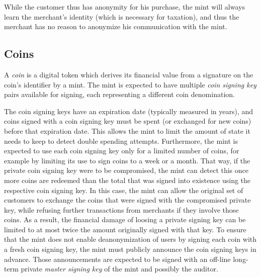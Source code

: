 \documentclass{llncs}
\begin{document}
While the customer thus has anonymity for his purchase, the mint will
always learn the merchant's identity (which is necessary for
taxation), and thus the merchant has no reason to anonymize his
communication with the mint.



\subsection{Coins}

A \emph{coin} is a digital token which derives its financial value
from a signature on the coin's identifier by a mint.  The mint is
expected to have multiple {\em coin signing key} pairs available for
signing, each representing a different coin denomination.

The coin signing keys have an expiration date (typically measured in
years), and coins signed with a coin signing key must be spent (or
exchanged for new coins) before that expiration date.  This allows the
mint to limit the amount of state it needs to keep to detect
double spending attempts.  Furthermore, the mint is expected to use each coin
signing key only for a limited number of coins, for example by
limiting its use to sign coins to a week or a month.  That way, if the
private coin signing key were to be compromised, the mint can detect
this once more coins are redeemed than the total that was signed into
existence using the respective coin signing key.  In this case, the
mint can allow the original set of customers to exchange the coins
that were signed with the compromised private key, while refusing
further transactions from merchants if they involve those coins.  As a
result, the financial damage of loosing a private signing key can be
limited to at most twice the amount originally signed with that key.
To ensure that the mint does not enable deanonymization of users by
signing each coin with a fresh coin signing key, the mint must
publicly announce the coin signing keys in advance.  Those
announcements are expected to be signed with an off-line long-term
private {\em master signing key} of the mint and possibly the auditor.
\end{document}
